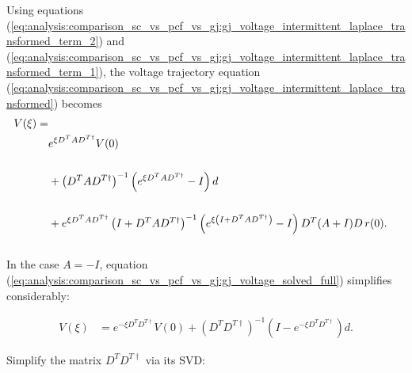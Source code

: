\begin{enumerate}
Using equations (\ref{eq:analysis:comparison_sc_vs_pcf_vs_gj:gj_voltage_intermittent_laplace_transformed_term_2}) and (\ref{eq:analysis:comparison_sc_vs_pcf_vs_gj:gj_voltage_intermittent_laplace_transformed_term_1}), the voltage trajectory equation (\ref{eq:analysis:comparison_sc_vs_pcf_vs_gj:gj_voltage_intermittent_laplace_transformed}) becomes 
\begin{align}
	\label{eq:analysis:comparison_sc_vs_pcf_vs_gj:gj_voltage_solved_full}
	V(\xi)
	= \notag \\ \notag
	& e^{\xi D^T A D^{T \dagger}} V(0)
	\\ \notag
	\\ &+ 
	\left(
		D^T A D^{T \dagger}
	\right)^{-1}
	\left(
		e^{\xi D^T A D^{T \dagger}} - I
	\right)
	d
	\\ \notag
	\\&+ \notag
	e^{\xi D^T A D^{T \dagger}}
	\left( I + D^T A D^{T \dagger} \right)^{-1}
	\left(
		e^{\xi \left( I + D^T A D^{T \dagger} \right)} - I
	\right)
	D^T(A + I)D \, r(0).
\end{align}
\\
In the case $A = -I$, equation (\ref{eq:analysis:comparison_sc_vs_pcf_vs_gj:gj_voltage_solved_full}) simplifies considerably:

\begin{align}	
\label{eq:analysis:comparison_sc_vs_pcf_vs_gj:gj_voltage_solved_simple}
	V(\xi)
	&=
	 e^{-\xi D^T D^{T \dagger}} V(0)
	+
	\left(
		D^T D^{T \dagger}
	\right)^{-1}
	\left(
		I - e^{-\xi D^T D^{T \dagger}}
	\right)
	d.
\end{align}

Simplify the matrix $D^T D^{T \dagger}$ via its SVD:


\end{enumerate}
